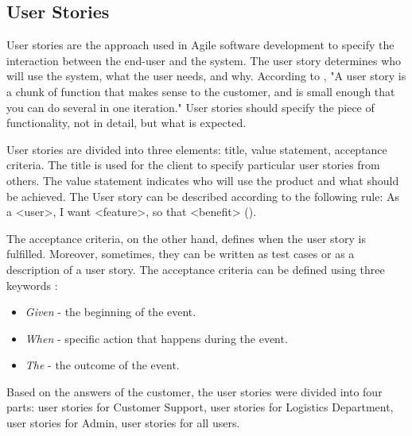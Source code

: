 \documentclass[a4paper]{article}
\begin{document}
    \newpage
    
    \subsection{User Stories} 
    
    User stories are the approach used in Agile software development to specify the interaction between the end-user and the system. The user story determines who will use the system, what the user needs, and why. According to \cite{beck2001planning}, "A user story is a chunk of function that makes sense to the customer, and is small enough that you can do several in one iteration." User stories should specify the piece of functionality, not in detail, but what is expected. 
    
    User stories are divided into three elements: title, value statement, acceptance criteria. The title is used for the client to specify particular user stories from others. The value statement indicates who will use the product and what should be achieved. The User story can be described according to the following rule: As a <user>, I want <feature>, so that <benefit> (\cite{pandit2015agileuat}).
    
    The acceptance criteria, on the other hand, defines when the user story is fulfilled. Moreover, sometimes, they can be written as test cases or as a description of a user story. The acceptance criteria can be defined using three keywords :
    \begin{itemize}
        \item \emph{Given} - the beginning of the event.
        \item \emph{When} - specific action that happens during the event.
        \item \emph{The} - the outcome of the event.
    \end{itemize}
     
    Based on the answers of the customer, the user stories were divided into four parts: user stories for  Customer Support, user stories for Logistics Department, user stories for Admin, user stories for all users. 
        
\end{document}
